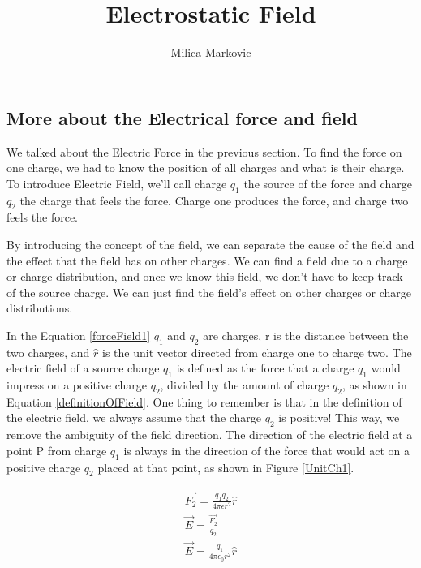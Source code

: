 \documentclass{ximera}
\title{Electrostatic Field}
\author{Milica Markovic}
\begin{document}
  
\begin{abstract}  

\end{abstract}  
\maketitle    




\subsection{More about the Electrical force and field}

We talked about the Electric Force in the previous section. To find the force on one charge, we had to know the position of all charges and what is their charge.  To introduce Electric Field, we'll call charge $q_1$ the source of the force and charge $q_2$ the charge that feels the force. Charge one produces the force, and charge two feels the force. 

By introducing the concept of the field, we can separate the cause of the field and the effect that the field has on other charges. We can find a field due to a charge or charge distribution, and once we know this field, we don't have to keep track of the source charge. We can just find the field's effect on other charges or charge distributions.


 In the Equation \ref{forceField1} $q_1$ and $q_2$ are charges, r is the distance between the two charges, and $\hat{r}$ is the unit vector directed  from charge one to charge two. The electric field of a source charge $q_1$ is defined as the force that a charge $q_1$ would impress on a positive charge $q_2$, divided by the amount of charge $q_2$, as shown in Equation \ref{definitionOfField}. One thing to remember is that in the definition of the electric field, we always assume that the charge $q_2$ is positive! This way, we remove the ambiguity of the field direction. The direction of the electric field at a point P from charge $q_1$ is always in the direction of the force that would act on a positive charge $q_2$ placed at that point, as shown in Figure \ref{UnitCh1}.


\begin{eqnarray}
\vec{F_2}=\frac{q_1 q_2}{4 \pi \epsilon r^2 } \hat{r} \label{forceField1}\\
\vec{E} = \frac{\vec{F_2}}{q_2} \label{definitionOfField} \\
\vec{E} =  \frac{q_1}{4 \pi \epsilon_0 r^2} \hat{r} \label{electricfield}
\end{eqnarray} 
\end{document}
